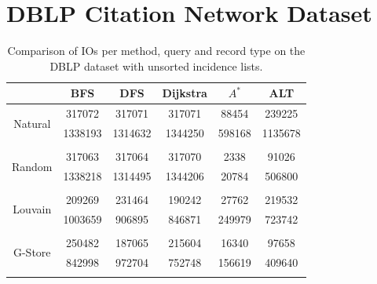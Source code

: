 \section*{DBLP Citation Network Dataset}
\begin{table}[H]
	\begin{center}
		 \begin{tabular}[c]{c c c c c c} \toprule
			  & BFS & DFS & Dijkstra & $A^*$  & ALT \\ \midrule 
 			\multirow{2}{*}{Natural}  & 317072 & 317071 & 317071 & 88454 & 239225 \\ 
 				 & 1338193 & 1314632 & 1344250 & 598168 & 1135678 \\ 
 				&&&&& \\[-0.5em]
 			\multirow{2}{*}{Random}  & 317063 & 317064 & 317070 & 2338 & 91026 \\ 
 				 & 1338218 & 1314495 & 1344206 & 20784 & 506800 \\ 
 				&&&&& \\[-0.5em]
 			\multirow{2}{*}{Louvain}  & 209269 & 231464 & 190242 & 27762 & 219532 \\ 
 				 & 1003659 & 906895 & 846871 & 249979 & 723742 \\ 
 				&&&&& \\[-0.5em]
 			\multirow{2}{*}{G-Store}  & 250482 & 187065 & 215604 & 16340 & 97658 \\ 
 				 & 842998 & 972704 & 752748 & 156619 & 409640 \\ 
 				&&&&& \\[-0.5em]
 					\end{tabular}  
  	 \end{center}
	 \caption{Comparison of IOs per method, query and record type on the DBLP dataset with unsorted incidence lists.}
	 \label{dblp-uns}
\end{table}

